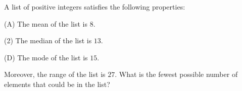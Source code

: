 A list of positive integers satisfies the following properties:

(A) The mean of the list is $8$.

(2) The median of the list is $13$.

(D) The mode of the list is $15$.

Moreover, the range of the list is $27$. What is the fewest possible number of elements that could be in the list?
